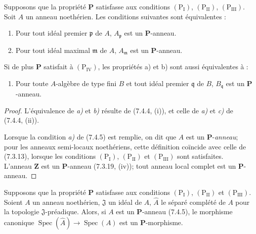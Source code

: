 \begin{corollary}[7.4.5]
\label{IV.2.s7.4.5-fr}
Supposons que la propriété $\boldsymbol P$ satisfasse aux conditions
$(\mathrm P_{\mathrm I})$, $(\mathrm P_{\mathrm{II}})$,
$(\mathrm P_{\mathrm{III}})$. Soit $A$ un anneau noethérien. Les conditions
suivantes sont équivalentes :
\begin{enumerate}
\item[\emph{a)}] Pour tout idéal premier $\mathfrak p$ de $A$,
$A_{\mathfrak p}$ est un $\boldsymbol P$-anneau.
\item[\emph{b)}] Pour tout idéal maximal $\mathfrak m$ de $A$,
$A_{\mathfrak m}$ est un $\boldsymbol P$-anneau.
\end{enumerate}
Si de plus $\boldsymbol P$ satisfait à $(\mathrm P_{\mathrm{IV}})$, les
propriétés \textup{a)} et \textup{b)} sont aussi équivalentes à :
\begin{enumerate}
\item[\emph{c)}] Pour toute $A$-algèbre de type fini $B$ et tout idéal
premier $\mathfrak q$ de $B$, $B_{\mathfrak q}$ est un
$\boldsymbol P$-anneau.
\end{enumerate}
\end{corollary}

\begin{proof}
L'équivalence de \emph{a)} et \emph{b)} résulte de (7.4.4, (i)), et celle de \emph{a)} et \emph{c)} de
(7.4.4, (ii)).

Lorsque la condition \emph{a)} de (7.4.5) est remplie, on dit que $A$ est un
$\boldsymbol P$-\emph{anneau}; pour les anneaux semi-locaux noethériens, cette
définition coïncide avec celle de (7.3.13), lorsque les conditions
$(\mathrm P_{\mathrm I})$, $(\mathrm P_{\mathrm{II}})$ et
$(\mathrm P_{\mathrm{III}})$ sont satisfaites. L'anneau $\mathbf Z$ est un
$\boldsymbol P$-anneau (7.3.19, (iv)); tout anneau local complet est un
$\boldsymbol P$-anneau.
\end{proof}

\begin{proposition}[7.4.6]
\label{IV.2.s7.4.6-fr}
Supposons que la propriété $\boldsymbol P$ satisfasse aux conditions
$(\mathrm P_{\mathrm I})$, $(\mathrm P_{\mathrm{II}})$ et
$(\mathrm P_{\mathrm{III}})$. Soient $A$ un anneau noethérien,
$\mathfrak J$ un idéal de $A$, $\widehat A$ le séparé complété de $A$ pour
la topologie $\mathfrak J$-préadique. Alors, si $A$ est un
$\boldsymbol P$-anneau (7.4.5), le morphisme canonique
$\operatorname{Spec}(\widehat A)\to\operatorname{Spec}(A)$ est un
$\boldsymbol P$-morphisme.
\end{proposition}

